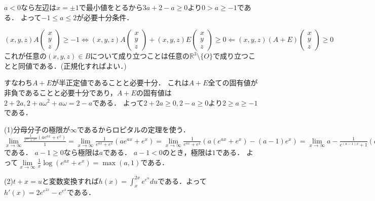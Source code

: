 \documentclass[
		book,
		head_space=20mm,
		foot_space=20mm,
		gutter=10mm,
		line_length=190mm
]{jlreq}
\begin{document}
$a<0$なら左辺は$x=\pm1$で最小値をとるから$3a+2-a\ge 0$より$0>a\ge-1$である．
よって$-1\le a\le 2$が必要十分条件．
\begin{tcolorbox}[blanker,breakable,
left=3mm,right=3mm,
top=3mm,bottom=3mm,
before skip=15pt,after skip=15pt,
borderline vertical={1pt}{0pt}{black,dotted}]
$(x,y,z) A\begin{pmatrix}
x\\y\\z
\end{pmatrix}\ge -1 \Leftrightarrow (x,y,z) A\begin{pmatrix}
x\\y\\z
\end{pmatrix}+(x,y,z) E\begin{pmatrix}
x\\y\\z
\end{pmatrix}\ge 0\Leftarrow (x,y,z) (A+E)\begin{pmatrix}
x\\y\\z
\end{pmatrix}\ge 0$
これが任意の$(x,y,z)\in B$について成り立つことは任意の$\mathbb{R}^3\setminus\{O\}$で成り立つことと同値である．(正規化すればよい．)

すなわち$A+E$が半正定値であることと必要十分．
これは$A+E$全ての固有値が非負であることと必要十分であり，$A+E$の固有値は$2+2a,2+a\omega^2+a\omega=2-a$である．
よって$2+2a\ge 0,2-a\ge0$より$2\ge a\ge -1$である．
\end{tcolorbox}

(1)分母分子の極限が$\infty$であるからロピタルの定理を使う．
$\lim\limits_{x\to \infty} \frac{\frac{1}{e^{ax}+e^x}(ae^{ax}+e^x)}{1}=\lim\limits_{x\to \infty} \frac{1}{e^{ax}+e^x}(ae^{ax}+e^x)=\lim\limits_{x\to \infty} \frac{1}{e^{ax}+e^x}(a(e^{ax}+e^x)-(a-1)e^x)=\lim\limits_{x\to \infty} a-\frac{1}{e^{(a-1)x}+1}(a-1)$である．
$a-1\ge0$なら極限は$a$である．
$a-1<0$のとき，極限は$1$である．
よって$\lim\limits_{x\to \infty}\frac{1}{x}\log(e^{ax}+e^x)=\max(a,1)$である．

(2)$t+x=u$と変数変換すれば$h(x)=\int_x^{2x}e^{e^u}du$である．よって$h'(x)=2e^{e^{2x}}-e^{e^x}$である．
\end{document}
